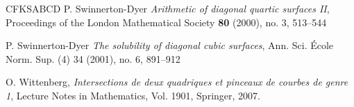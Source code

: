 \documentclass[10pt]{amsart}
\numberwithin{equation}{section}
\theoremstyle{remark}
\theoremstyle{definition}
\theoremstyle{definition}
\theoremstyle{definition}
\theoremstyle{definition}
\theoremstyle{definition}
\theoremstyle{definition}
\theoremstyle{definition}
\theoremstyle{definition}
\begin{document}
\begin{thebibliography}{CFKSABCD}
P. Swinnerton-Dyer   \textit{Arithmetic of diagonal quartic surfaces II}, Proceedings of the London Mathematical Society \textbf{80}  (2000), no. 3, 513–544

  
P. Swinnerton-Dyer   \textit{The solubility of diagonal cubic surfaces}, Ann. Sci. École Norm. Sup. (4) 34 (2001), no. 6, 891–912
 
   
  
O. Wittenberg, \textit{Intersections de deux quadriques et pinceaux de courbes de genre 1}, Lecture Notes in Mathematics, Vol. 1901, Springer, 2007.


 
%  
%              
%
%
%
%
%   
%
%
 

\end{thebibliography}




 
\end{document}
